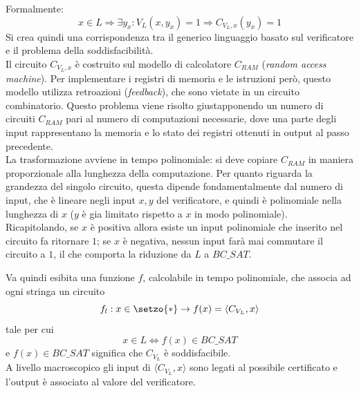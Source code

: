 Formalmente:
\begin{equation*}
    x \in L \Rightarrow \exists y_x : V_L \left( x, y_x \right) = 1 \Rightarrow C_{V_L,x} \left( y_x \right) = 1
\end{equation*}
Si crea quindi una corrispondenza tra il generico linguaggio basato sul verificatore e il problema della soddisfacibilità.
\\
Il circuito $C_{V_L,x}$ è costruito sul modello di calcolatore $C_{RAM}$ (\emph{random access machine}). Per implementare i registri di memoria e le istruzioni però, questo modello utilizza retroazioni (\emph{feedback}), che sono vietate in un circuito combinatorio. Questo problema viene risolto giustapponendo un numero di circuiti $C_{RAM}$ pari al numero di computazioni necessarie, dove una parte degli input rappresentano la memoria e lo stato dei registri ottenuti in output al passo precedente.
\\
La trasformazione avviene in tempo polinomiale: si deve copiare $C_{RAM}$ in maniera proporzionale alla lunghezza della computazione. Per quanto riguarda la grandezza del singolo circuito, questa dipende fondamentalmente dal numero di input, che è lineare negli input $x,y$ del verificatore, e quindi è polinomiale nella lunghezza di $x$ ($y$ è gia limitato rispetto a $x$ in modo polinomiale).
\\
Ricapitolando, se $x$ è positiva allora esiste un input polinomiale che inserito nel circuito fa ritornare $1$; se $x$ è negativa, nessun input farà mai commutare il circuito a $1$, il che comporta la riduzione da $L$ a $BC\_SAT$.

Va quindi esibita una funzione $f$, calcolabile in tempo polinomiale, che associa ad ogni stringa un circuito
\begin{equation*}
    f_l : x \in \setzo{*} \to f(x) = \langle C_{V_{L}},x \rangle
\end{equation*}
tale per cui
\begin{equation*}
    x \in L \Leftrightarrow f(x) \in BC\_SAT
\end{equation*}
e $f(x) \in BC\_SAT$ significa che $C_{V_{L}}$ è soddisfacibile.
\\
A livello macroscopico gli input di $\langle C_{V_{L}},x \rangle$ sono legati al possibile certificato e l'output è associato al valore del verificatore.

